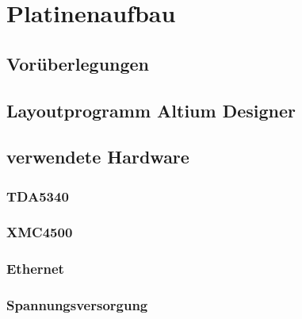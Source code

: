 \chapter{Platinenaufbau}
\label{sec:Platinenaufbau}
\pagestyle{scrheadings}

\section{Vorüberlegungen}

\section{Layoutprogramm Altium Designer}

\section{verwendete Hardware}

\subsection{TDA5340}

\subsection{XMC4500}

\subsection{Ethernet}


\subsection{Spannungsversorgung}